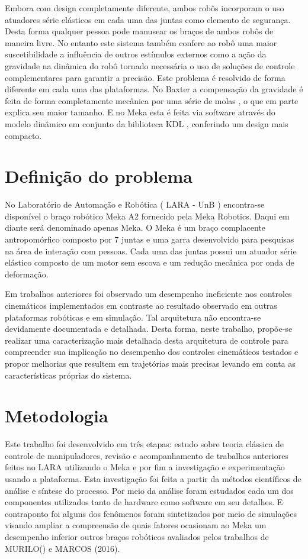 Embora com design completamente diferente, ambos robôs incorporam o uso atuadores série elásticos em cada uma das juntas como elemento de segurança. Desta forma qualquer pessoa pode manusear os braços de ambos robôs de maneira livre. No entanto este sistema também confere ao robô uma maior suscetibilidade a influência de outros estímulos externos como a ação da gravidade na dinâmica do robô tornado necessária o uso de soluções de controle complementares para garantir a precisão. \cite{nobody} Este problema é resolvido de forma diferente em cada uma das plataformas. No Baxter a compensação da gravidade é feita de forma completamente mecânica por uma série de molas \cite{nobody}, o que em parte explica seu maior tamanho. E no Meka esta é feita via software através do modelo dinâmico em conjunto da biblioteca KDL \cite{nobody}, conferindo um design mais compacto. 


\section{Definição do problema}

No Laboratório de Automação e Robótica ( LARA - UnB ) encontra-se disponível o braço robótico Meka A2 fornecido pela Meka Robotics. Daqui em diante será denominado apenas Meka. O Meka é um braço complacente antropomórfico composto por 7 juntas e uma garra desenvolvido para pesquisas na área de interação com pessoas. Cada uma das juntas possui um atuador série elástico composto de um motor sem escova e um redução mecânica por onda de deformação.

Em trabalhos anteriores foi observado um desempenho ineficiente nos controles cinemáticos implementados em contraste ao resultado observado em outras plataformas robóticas e em simulação. Tal arquitetura não encontra-se devidamente documentada e detalhada. Desta forma, neste trabalho, propõe-se realizar uma caracterização mais detalhada desta arquitetura de controle para compreender sua implicação no desempenho dos controles cinemáticos testados e propor melhorias que resultem em trajetórias mais precisas levando em conta as características próprias do sistema.

\section{Metodologia}

Este trabalho foi desenvolvido em três etapas: estudo sobre teoria clássica de controle de manipuladores, revisão e acompanhamento de trabalhos anteriores feitos no LARA utilizando o Meka e por fim a investigação e experimentação usando a plataforma. Esta investigação foi feita a partir da métodos científicos de análise e síntese do processo. Por meio da análise foram estudados cada um dos componentes utilizados tanto de hardware como software em seu detalhes. E contraponto foi alguns dos fenômenos foram sintetizados por meio de simulações visando ampliar a compreensão de quais fatores ocasionam ao Meka um desempenho inferior outros braços robóticos avaliados pelos trabalhos de MURILO() e MARCOS (2016).

